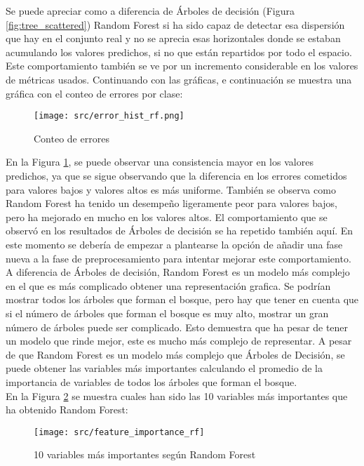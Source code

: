 Se puede apreciar como a diferencia de Árboles de decisión (Figura \ref{fig:tree_scattered}) Random Forest si ha sido capaz de detectar esa dispersión que hay en el conjunto real y no se aprecia esas horizontales donde se estaban acumulando los valores predichos, si no que están repartidos por todo el espacio. Este comportamiento también se ve por un incremento considerable en los valores de métricas usados.
\clearpage
Continuando con las gráficas, e continuación se muestra una gráfica con el conteo de errores por clase:
\begin{figure}[H]
	\centering
	\texttt{[image: src/error\_hist\_rf.png]}
	\caption{Conteo de errores}
	\label{fig:rf_error_plot}
\end{figure}
En la Figura \ref{fig:rf_error_plot}, se puede observar una consistencia mayor en los valores predichos, ya que se sigue observando que la diferencia en los errores cometidos para valores bajos y valores altos es más uniforme. También se observa como Random Forest ha tenido un desempeño ligeramente peor para valores bajos, pero ha mejorado en mucho en los valores altos. El comportamiento que se observó en los resultados de Árboles de decisión se ha repetido también aquí. En este momento se debería de empezar a plantearse la opción de añadir una fase nueva a la fase de preprocesamiento para intentar mejorar este comportamiento.\\
\linebreak
A diferencia de Árboles de decisión, Random Forest es un modelo más complejo en el que es más complicado obtener una representación grafica. Se podrían mostrar todos los árboles que forman el bosque, pero hay que tener en cuenta que si el número de árboles que forman el bosque es muy alto, mostrar un gran número de árboles puede ser complicado. Esto demuestra que ha pesar de tener un modelo que rinde mejor, este es mucho más complejo de representar. 
\clearpage
A pesar de que Random Forest es un modelo más complejo que Árboles de Decisión, se puede obtener las variables más importantes calculando el promedio de la importancia de variables de todos los árboles que forman el bosque.\\
En la Figura \ref{fig:feature_rf} se muestra cuales han sido las 10 variables más importantes que ha obtenido Random Forest:
\begin{figure}[H]
	\centering
	\texttt{[image: src/feature\_importance\_rf]}
	\caption{10 variables más importantes según Random Forest}
	\label{fig:feature_rf}
\end{figure}
